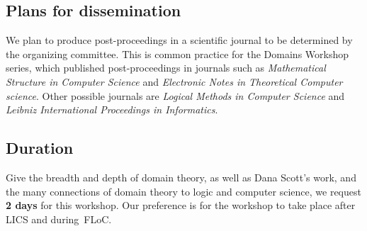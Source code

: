 \documentclass{article}
\begin{document}

\subsection{Plans for dissemination}

We plan to produce post-proceedings in a scientific journal to be determined by the
organizing committee. This is common practice for the Domains Workshop series, which published post-proceedings in journals such as \emph{Mathematical Structure in Computer Science} and \emph{Electronic Notes in Theoretical Computer science}. Other possible journals are \emph{Logical Methods in Computer Science} and \emph{Leibniz International Proceedings in Informatics}.

\subsection{Duration}

Give the breadth and depth of domain theory, as well as Dana Scott's work, and the many
connections of domain theory to logic and computer science, we request \textbf{2 days} for
this workshop. Our preference is for the workshop to take place after LICS and during~FLoC.
\end{document}
